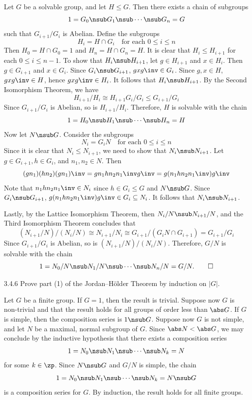 \begin{sol}[spsol]
    Let $G$ be a solvable group, and let $H \leq G$.
	Then there exists a chain of subgroups
    \[
    	1 = G_0 \nsub G_1 \nsub \cdots \nsub G_n = G
    \]
    such that $G_{i + 1}/G_i$ is Abelian.
	Define the subgroups
    \[
    	H_i = H \cap G_i \quad \text{for each $0 \leq i \leq n$}
    \]
    Then $H_0 = H \cap G_0 = 1$ and $H_n = H \cap G_n = H$.
	It is clear that $H_i \leq H_{i + 1}$ for each $0 \leq i \leq n - 1$.
	To show that $H_i \nsub H_{i + 1}$, let $g \in H_{i + 1}$ and $x \in H_i$.
	Then $g \in G_{i + 1}$ and $x \in G_i$.
	Since $G_i \nsub G_{i + 1}$, $gxg\inv \in G_i$.
	Since $g, x \in H$, $gxg\inv \in H$, hence $gxg\inv \in H_i$.
	It follows that $H_i \nsub H_{i + 1}$.
	By the Second Isomorphism Theorem, we have
    \[
    	H_{i + 1}/H_i \cong H_{i + 1}G_i/G_i \leq G_{i + 1}/G_i
    \]
    Since $G_{i + 1}/G_i$ is Abelian, so is $H_{i + 1}/H_i$.
	Therefore, $H$ is solvable with the chain
    \[
    	1 = H_0 \nsub H_1 \nsub \cdots \nsub H_n = H
    \]
    Now let $N \nsub G$.
	Consider the subgroups
    \[
    	N_i = G_iN \quad \text{for each $0 \leq i \leq n$}
    \]
    Since it is clear that $N_i \leq N_{i + 1}$, we need to show that $N_i \nsub N_{i + 1}$.
	Let $g \in G_{i + 1}, h \in G_i$, and $n_1, n_2 \in N$.
	Then
    \[
    	(gn_1)(hn_2)(gn_1)\inv = g n_1 h n_2 n_1\inv g\inv = g(n_1 h n_2 n_1\inv)g \inv
    \]
    Note that $n_1 hn_2n_1\inv \in N_i$ since $h \in G_i \leq G$ and $N \nsub G$.
	Since $G_i \nsub G_{i + 1}$, $g(n_1 h n_2 n_1\inv)g \inv \in G_i \subseteq N_i$.
	It follows that $N_i \nsub N_{i + 1}$.

    Lastly, by the Lattice Isomorphism Theorem, then $N_i/N \nsub N_{i + 1}/N$, and the Third Isomorphism Theorem concludes that
    \[
    	(N_{i + 1}/N)/(N_i/N) \cong N_{i + 1}/N_i \cong G_{i + 1}/(G_iN \cap G_{i + 1}) = G_{i + 1}/G_i
    \]
    Since $G_{i + 1}/G_i$ is Abelian, so is $(N_{i + 1}/N)/(N_i/N)$.
	Therefore, $G/N$ is solvable with the chain
    \[
    	1 = N_0/N \nsub N_1/N \nsub \cdots \nsub N_n/N = G/N. \qedhere
    \]
\end{sol}

\begin{exercise}{3.4.6}
    Prove part (1) of the Jordan--H\"older Theorem by induction on $|G|$.
\end{exercise}

\begin{sol}
    Let $G$ be a finite group.
	If $G = 1$, then the result is trivial.
	Suppose now $G$ is non-trivial and that the result holds for all groups of order less than $\abs G$.
	If $G$ is simple, then the composition series is $1 \nsub G$.
	Suppose now $G$ is not simple, and let $N$ be a maximal, normal subgroup of $G$.
	Since $\abs N < \abs G$, we may conclude by the inductive hypothesis that there exists a composition series
    \[
    	1 = N_0 \nsub N_1 \nsub \cdots \nsub N_k = N
    \]
    for some $k \in \zp$.
	Since $N \nsub G$ and $G/N$ is simple, the chain
    \[
    	1 = N_0 \nsub N_1 \nsub \cdots \nsub N_k = N \nsub G
    \]
    is a composition series for $G$.
	By induction, the result holds for all finite groups.
\end{sol}

